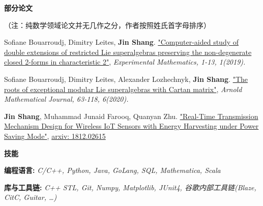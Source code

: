 \documentclass[letterpaper,11pt]{article}
\newcommand{\resheading}[1]{{\large \colorbox{mygrey}{\begin{minipage}{\linewidth}{\textbf{#1 \vphantom{p\^{E}}}}\end{minipage}}}}
\begin{document}
\resheading{部分论文}
\footnotesize（注：纯数学领域论文并无几作之分，作者按照姓氏首字母排序）
\begin{description}
	\item \footnotesize Sofiane Bouarroudj, Dimitry Leites, \textbf{Jin Shang}. \href{https://arxiv.org/abs/1904.09579}{"Computer-aided study of double extensions of restricted Lie superalgebras preserving the non-degenerate closed 2-forms in characteristic 2"}, \textit{Experimental Mathematics, 1-13, 1(2019).} 
	\item \footnotesize Sofiane Bouarroudj, Dimitry Leites, Alexander Lozhechnyk, \textbf{Jin Shang}. \href{https://arxiv.org/abs/1904.09578}{"The roots of exceptional modular Lie superalgebras with Cartan matrix"}, \textit{Arnold Mathematical Journal, 63-118, 6(2020).} 
	\item \footnotesize  \textbf{Jin Shang}, Muhammad Junaid Farooq, Quanyan Zhu. \href{https://arxiv.org/abs/1812.02615}{"Real-Time Transmission Mechanism Design for Wireless IoT Sensors with Energy Harvesting under Power Saving Mode"}, \href{https://arxiv.org/abs/1812.02615}{arxiv: 1812.02615}
\end{description}
\resheading{技能}
\begin{description}
	\item \footnotesize \textbf{编程语言:} \textit{C/C++, Python, Java, GoLang,  SQL, Mathematica, Scala}
	\item \footnotesize \textbf{库与工具链:} \textit{C++ STL, Git, Numpy, Matplotlib, JUnit4, 谷歌内部工具链(Blaze, CitC, Guitar, \dots)}
\end{description}

	
\end{document}
